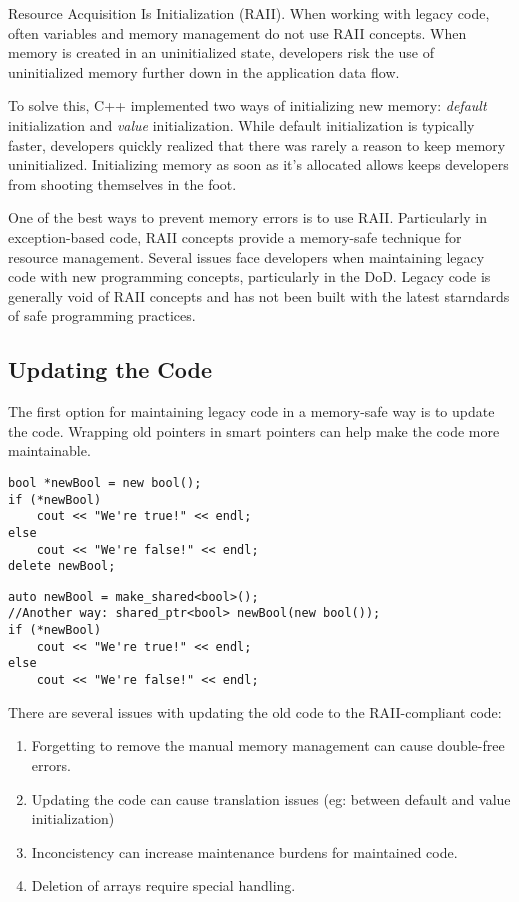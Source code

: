 Resource Acquisition Is Initialization (RAII). When working with legacy code, often variables and memory management do not use RAII concepts. When memory is created in an uninitialized state, developers risk the use of uninitialized memory further down in the application data flow.

To solve this, C++ implemented two ways of initializing new memory: \textit{default} initialization and \textit{value} initialization. While default initialization is typically faster, developers quickly realized that there was rarely a reason to keep memory uninitialized. Initializing memory as soon as it's allocated allows keeps developers from shooting themselves in the foot.

One of the best ways to prevent memory errors is to use RAII. Particularly in exception-based code, RAII concepts provide a memory-safe technique for resource management.\autocite{20210412-stroustrup2001} Several issues face developers when maintaining legacy code with new programming concepts, particularly in the DoD. Legacy code is generally void of RAII concepts and has not been built with the latest starndards of safe programming practices.

\subsection{Updating the Code}

The first option for maintaining legacy code in a memory-safe way is to update the code. Wrapping old pointers in smart pointers can help make the code more maintainable.

\begin{lstlisting}[caption={Non-compliant listing},captionpos=b,style=CStyle,basicstyle=\small]
bool *newBool = new bool();
if (*newBool)
	cout << "We're true!" << endl;
else
	cout << "We're false!" << endl;
delete newBool;
\end{lstlisting}

\begin{lstlisting}[caption={RAII-compliant listing},captionpos=b,style=CStyle,basicstyle=\small]
auto newBool = make_shared<bool>();
//Another way: shared_ptr<bool> newBool(new bool());
if (*newBool)
	cout << "We're true!" << endl;
else
	cout << "We're false!" << endl;
\end{lstlisting}

There are several issues with updating the old code to the RAII-compliant code:
\begin{enumerate}
	\item Forgetting to remove the manual memory management can cause double-free errors.
	\item Updating the code can cause translation issues (eg: between default and value initialization)
	\item Inconcistency can increase maintenance burdens for maintained code.
	\item Deletion of arrays require special handling.
\end{enumerate}

